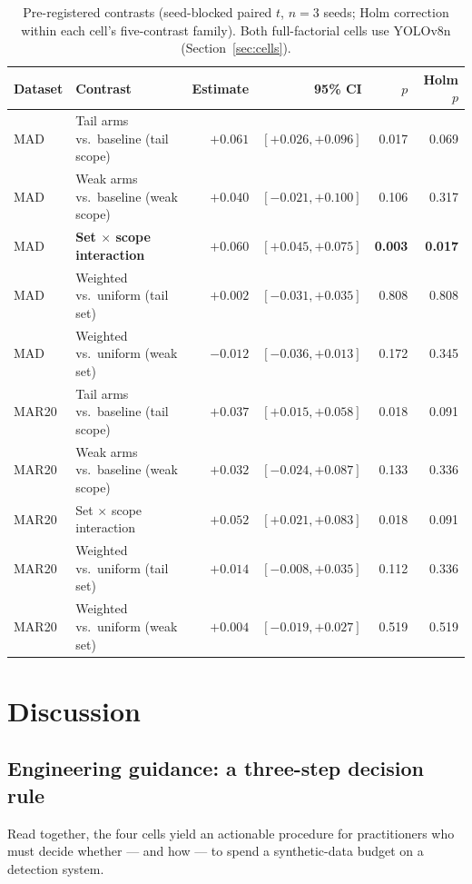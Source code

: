 \documentclass[preprint,12pt,authoryear]{elsarticle}
\begin{document}
\begin{table}[t]
\centering
\caption{Pre-registered contrasts (seed-blocked paired $t$, $n = 3$
seeds; Holm correction within each cell's five-contrast family). Both
full-factorial cells use YOLOv8n (Section~\ref{sec:cells}).}
\label{tab:contrasts}
\small
\begin{tabular}{llrrrr}
\toprule
Dataset & Contrast & Estimate & 95\% CI & $p$ & Holm $p$ \\
\midrule
MAD & Tail arms vs.\ baseline (tail scope)  & $+0.061$ & $[+0.026, +0.096]$ & 0.017 & 0.069 \\
MAD & Weak arms vs.\ baseline (weak scope)  & $+0.040$ & $[-0.021, +0.100]$ & 0.106 & 0.317 \\
MAD & \textbf{Set $\times$ scope interaction} & $\mathbf{+0.060}$ & $\mathbf{[+0.045, +0.075]}$ & \textbf{0.003} & \textbf{0.017} \\
MAD & Weighted vs.\ uniform (tail set)    & $+0.002$ & $[-0.031, +0.035]$ & 0.808 & 0.808 \\
MAD & Weighted vs.\ uniform (weak set)    & $-0.012$ & $[-0.036, +0.013]$ & 0.172 & 0.345 \\
\midrule
MAR20 & Tail arms vs.\ baseline (tail scope)  & $+0.037$ & $[+0.015, +0.058]$ & 0.018 & 0.091 \\
MAR20 & Weak arms vs.\ baseline (weak scope)  & $+0.032$ & $[-0.024, +0.087]$ & 0.133 & 0.336 \\
MAR20 & Set $\times$ scope interaction & $+0.052$ & $[+0.021, +0.083]$ & 0.018 & 0.091 \\
MAR20 & Weighted vs.\ uniform (tail set)    & $+0.014$ & $[-0.008, +0.035]$ & 0.112 & 0.336 \\
MAR20 & Weighted vs.\ uniform (weak set)    & $+0.004$ & $[-0.019, +0.027]$ & 0.519 & 0.519 \\
\bottomrule
\end{tabular}
\end{table}

\section{Discussion}\label{sec:discussion}

\subsection{Engineering guidance: a three-step decision rule}\label{sec:rules}

Read together, the four cells yield an actionable procedure for
practitioners who must decide whether --- and how --- to spend a
synthetic-data budget on a detection system.
\end{document}

